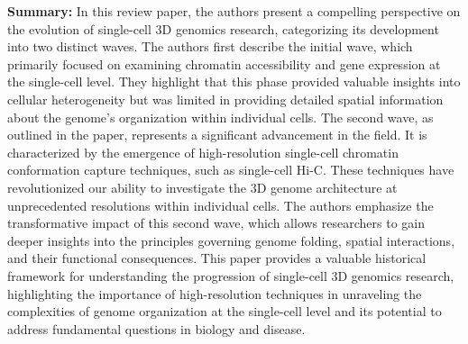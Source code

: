 \begin{enumerate}
    \textbf{Summary:} In this review paper, the authors present a compelling perspective on the evolution of single-cell 3D genomics research, categorizing its development into two distinct waves. The authors first describe the initial wave, which primarily focused on examining chromatin accessibility and gene expression at the single-cell level. They highlight that this phase provided valuable insights into cellular heterogeneity but was limited in providing detailed spatial information about the genome's organization within individual cells. The second wave, as outlined in the paper, represents a significant advancement in the field. It is characterized by the emergence of high-resolution single-cell chromatin conformation capture techniques, such as single-cell Hi-C. These techniques have revolutionized our ability to investigate the 3D genome architecture at unprecedented resolutions within individual cells. The authors emphasize the transformative impact of this second wave, which allows researchers to gain deeper insights into the principles governing genome folding, spatial interactions, and their functional consequences. This paper provides a valuable historical framework for understanding the progression of single-cell 3D genomics research, highlighting the importance of high-resolution techniques in unraveling the complexities of genome organization at the single-cell level and its potential to address fundamental questions in biology and disease.
\end{enumerate}